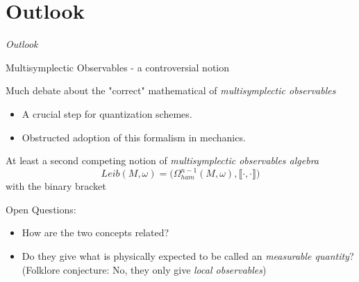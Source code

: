 \documentclass[10pt]{beamer}
\begin{document}
\section*{Outlook}
\begin{frame}
	\begin{center}
	\Huge\emph{Outlook}
	\end{center}
\end{frame}
\addtocounter{framenumber}{-1}

\begin{frame}{Multisymplectic Observables - a controversial notion}
	\begin{block}{ Much debate about the "correct" mathematical of \emph{multisymplectic observables}}
		\begin{itemize}
			\item A crucial step for quantization schemes.
			\item Obstructed adoption of this formalism in mechanics.
		\end{itemize}	
	\end{block}		
	\vspace{1.5em} \pause
	\begin{block}{ At least a second competing notion of \emph{multisymplectic observables algebra}}
		\begin{displaymath}
			Leib(M,\omega) = \Big( \Omega_{ham}^{n-1}(M,\omega), \llbracket\cdot,\cdot\rrbracket \Big)
		\end{displaymath}
		with the binary bracket 
		\begin{center}
				
		\end{center}
	\end{block}	
	\vspace{1em} \pause
	\begin{block}{Open Questions:}
		\begin{itemize}
			\item How are the two concepts related?
			\item Do they give what is physically expected to be called an \emph{measurable quantity}?
				\\
				(Folklore conjecture: No, they only give \emph{local observables})				
		\end{itemize}
	\end{block}
\end{frame}
\end{document}
